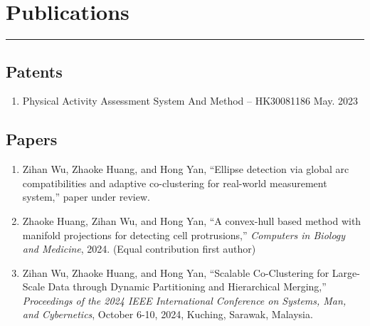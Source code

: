 \documentclass{article}
\newcommand{\cussection}[1]{\vspace{--0.05in}\section*{#1}\vspace{--0.1in} \hrule\vspace{0.2in} }
\begin{document}
\cussection{Publications}

\subsection*{Patents}
\begin{enumerate}
    \item Physical Activity Assessment System And Method -- HK30081186 \hfill May. 2023
\end{enumerate}


\subsection*{Papers}
\begin{enumerate}

    \item Zihan Wu, Zhaoke Huang, and Hong Yan, ``Ellipse detection via global arc compatibilities and adaptive co-clustering for real-world measurement system,'' paper under review.
    \item Zhaoke Huang, Zihan Wu, and Hong Yan, ``A convex-hull based method with manifold projections for detecting cell protrusions,'' \emph{Computers in Biology and Medicine}, 2024. (Equal contribution first author)
    \item Zihan Wu, Zhaoke Huang, and Hong Yan, ``Scalable Co-Clustering for Large-Scale Data through Dynamic Partitioning and Hierarchical Merging,'' \emph{Proceedings of the 2024 IEEE International Conference on Systems, Man, and Cybernetics}, October 6-10, 2024, Kuching, Sarawak, Malaysia.
\end{enumerate}







\end{document}
